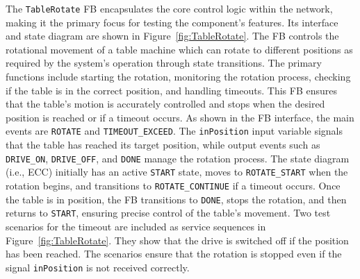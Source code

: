 \begin{bibunit}
The \texttt{TableRotate} FB encapsulates the core control logic within the network, making it the primary focus for testing the component's features. Its interface and state diagram are shown in Figure~\ref{fig:TableRotate}. The FB controls the rotational movement of a table machine which can rotate to different positions as required by the system's operation through state transitions. The primary functions include starting the rotation, monitoring the rotation process, checking if the table is in the correct position, and handling timeouts. This FB ensures that the table's motion is accurately controlled and stops when the desired position is reached or if a timeout occurs. As shown in the FB interface, the main events are \texttt{ROTATE} and \texttt{TIMEOUT\_EXCEED}. The \texttt{inPosition} input variable signals that the table has reached its target position, while output events such as \texttt{DRIVE\_ON}, \texttt{DRIVE\_OFF}, and \texttt{DONE} manage the rotation process. The state diagram (i.e., ECC) initially has an active \texttt{START} state, moves to \texttt{ROTATE\_START} when the rotation begins, and transitions to \texttt{ROTATE\_CONTINUE} if a timeout occurs. Once the table is in position, the FB transitions to \texttt{DONE}, stops the rotation, and then returns to \texttt{START}, ensuring precise control of the table's movement. Two test scenarios for the timeout are included as service sequences in Figure~\ref{fig:TableRotate}. They show that the drive is switched off if the position has been reached. The scenarios ensure that the rotation is stopped even if the signal \texttt{inPosition} is not received correctly.


\end{bibunit}
